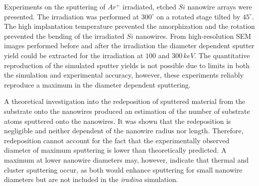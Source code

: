 Experiments on the sputtering of $Ar^+$ irradiated, etched $Si$ nanowire arrays were presented. The irradiation was performed at $300^\circ$ on a rotated stage tilted by $45^\circ$. The high implantation temperature prevented the amorphization and the rotation prevented the bending of the irradiated $Si$ nanowires. From high-resolution SEM images performed before and after the irradiation the diameter dependent sputter yield could be extracted for the irradiation at $100$ and $300\,keV$. The quantitative reproduction of the simulated sputter yields is not possible due to limits in both the simulation and experimental accuracy, however, these experiments reliably reproduce a maximum in the diameter dependent sputtering. 

A theoretical investigation into the redeposition of sputtered material from the substrate onto the nanowires produced an estimation of the number of substrate atoms sputtered onto the nanowires. It was shown that the redeposition is negligible and neither dependent of the nanowire radius nor length. Therefore, redeposition cannot account for the fact that the experimentally observed diameter of maximum sputtering is lower than theoretically predicted. A maximum at lower nanowire diameters may, however, indicate that thermal and cluster sputtering occur, as both would enhance sputtering for small nanowire diameters but are not included in the \emph{iradina} simulation.

